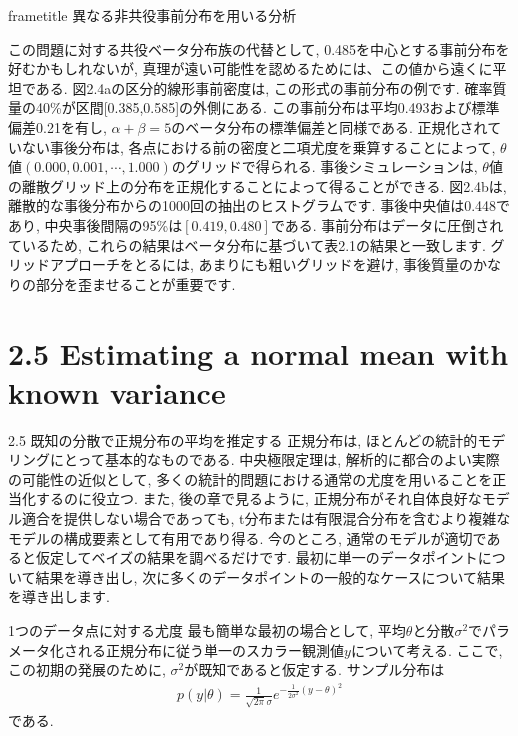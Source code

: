 \documentclass[10pt,dvipdfmx,a4]{beamer}
\newcommand{\eqn}[1]{\begin{align*}#1\end{align*}}
\newcommand{\dbox}[1]{\begin{beamercolorbox}[wd=122mm, sep=0pt, shadow=false, rounded=false]{frametitle} { #1}\end{beamercolorbox}}
\begin{document}
\begin{frame}
\dbox{異なる非共役事前分布を用いる分析}
この問題に対する共役ベータ分布族の代替として, 0.485を中心とする事前分布を好むかもしれないが, 真理が遠い可能性を認めるためには、この値から遠くに平坦である.
図2.4aの区分的線形事前密度は, この形式の事前分布の例です.
確率質量の40\%が区間[0.385,0.585]の外側にある.
この事前分布は平均0.493および標準偏差0.21を有し, $\alpha+\beta=5$のベータ分布の標準偏差と同様である.
正規化されていない事後分布は, 各点における前の密度と二項尤度を乗算することによって, $\theta$値$(0.000, 0.001,\cdots,1.000)$のグリッドで得られる.
事後シミュレーションは, $\theta$値の離散グリッド上の分布を正規化することによって得ることができる.
図2.4bは, 離散的な事後分布からの1000回の抽出のヒストグラムです.
事後中央値は0.448であり, 中央事後間隔の95\%は$[0.419,0.480]$である.
事前分布はデータに圧倒されているため, これらの結果はベータ分布に基づいて表2.1の結果と一致します.
グリッドアプローチをとるには, あまりにも粗いグリッドを避け, 事後質量のかなりの部分を歪ませることが重要です.
\end{frame}

\section{2.5 Estimating a normal mean with known variance}
\begin{frame}{2.5 既知の分散で正規分布の平均を推定する}
正規分布は, ほとんどの統計的モデリングにとって基本的なものである.
中央極限定理は, 解析的に都合のよい実際の可能性の近似として, 多くの統計的問題における通常の尤度を用いることを正当化するのに役立つ.
また, 後の章で見るように, 正規分布がそれ自体良好なモデル適合を提供しない場合であっても, t分布または有限混合分布を含むより複雑なモデルの構成要素として有用であり得る.
今のところ, 通常のモデルが適切であると仮定してベイズの結果を調べるだけです.
最初に単一のデータポイントについて結果を導き出し, 次に多くのデータポイントの一般的なケースについて結果を導き出します.
\end{frame}


\begin{frame}{1つのデータ点に対する尤度}
最も簡単な最初の場合として, 平均$\theta$と分散$\sigma^2$でパラメータ化される正規分布に従う単一のスカラー観測値$y$について考える.
ここで, この初期の発展のために, $\sigma^2$が既知であると仮定する.
サンプル分布は
\eqn{p(y|\theta)=\frac{1}{\sqrt{2\pi}\sigma}e^{-\frac{1}{2\sigma^2}(y-\theta)^2}}
である.
\end{frame}
\end{document}
